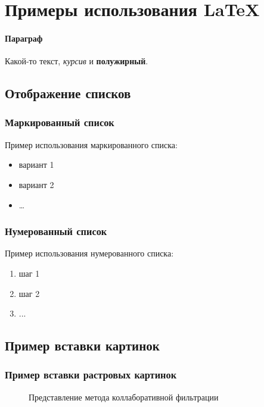 \section{Примеры использования \LaTeX}
\paragraph{Параграф}
Какой-то текст, \textit{курсив} и \textbf{полужирный}.

\subsection{Отображение списков}
\subsubsection{Маркированный список}
Пример использования маркированного списка:

\begin{itemize}
  \item вариант 1
  \item вариант 2
  \item \dots
\end{itemize}

\subsubsection{Нумерованный список}
Пример использования нумерованного списка:

\begin{enumerate}
  \item шаг 1
  \item шаг 2
  \item ...
\end{enumerate}

\subsection{Пример вставки картинок}
\subsubsection{Пример вставки растровых картинок}
\begin{figure}[h]
  \caption{Представление метода коллаборативной фильтрации}
\end{figure}

